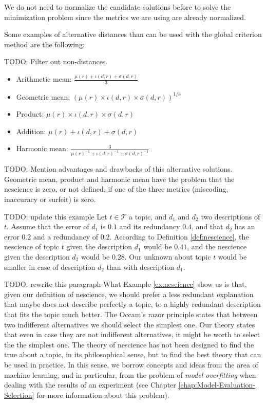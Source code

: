 We do not need to normalize the candidate solutions before to solve the minimization problem since the metrics we are using are already normalized.

Some examples of alternative distances than can be used with the global criterion method are the following:

{\color{red} TODO: Filter out non-distances.}

\begin{itemize}
\item Arithmetic mean: $\frac{\mu(r) + \iota(d, r) + \sigma(d, r)}{3}$
\item Geometric mean: $\left( \mu(r) \times \iota(d, r) \times \sigma(d, r) \right)^{1/3}$
\item Product: $\mu(r) \times \iota(d, r) \times \sigma(d, r)$
\item Addition: $\mu(r) + \iota(d, r) + \sigma(d, r)$
\item Harmonic mean: $\frac{3}{ \mu(r)^{-1} + \iota(d, r)^{-1} + \sigma(d, r)^{-1} }$
\end{itemize}

{\color{red} TODO: Mention advantages and drawbacks of this alternative solutions.} Geometric mean, product and harmonic mean have the problem that the nescience is zero, or not defined, if one of the three metrics (miscoding, inaccuracy or surfeit) is zero.

\begin{example}
\label{ex:nescience}
{\color{red} TODO: update this example} Let $t \in \mathcal{T}$ a topic, and $d_1$ and $d_2$ two descriptions of $t$. Assume that the error of $d_1$ is $0.1$ and its redundancy $0.4$, and that $d_2$ has an error $0.2$ and a redundancy of $0.2$. According to Definition \ref{def:nescience}, the nescience of topic $t$ given the description $d_1$ would be $0.41$, and the nescience given the description $d_2$ would be $0.28$. Our unknown about topic $t$ would be smaller in case of description $d_2$ than with description $d_1$.
\end{example}

{\color{red} TODO: rewrite this paragraph} What Example \ref{ex:nescience} show us is that, given our definition of nescience, we should prefer a less redundant explanation that maybe does not describe perfectly a topic, to a highly redundant description that fits the topic much better. The Occam's razor principle states that between two indifferent alternatives we should select the simplest one. Our theory states that even in case they are not indifferent alternatives, it might be worth to select the the simplest one. The theory of nescience has not been designed to find the true about a topic, in its philosophical sense, but to find the best theory that can be used in practice. In this sense, we borrow concepts and ideas from the area of machine learning, and in particular, from the problem of \emph{model overfitting} when dealing with the results of an experiment (see Chapter \ref{chap:Model-Evaluation-Selection} for more information about this problem).

